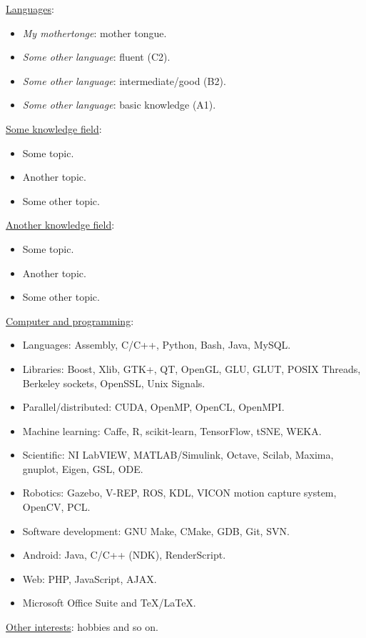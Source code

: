 \addskill%
{%
    \underline{Languages}:%
    \begin{multicols}{2}
        \begin{itemize}[nosep, rightmargin=0cm,after*={\vspace{-\baselineskip}}]%
            \item {\em My mothertonge}: mother tongue.
            \item {\em Some other language}: fluent (C2).
            \columnbreak
            \item {\em Some other language}: intermediate/good (B2).
            \item {\em Some other language}: basic knowledge (A1).%
        \end{itemize}%
    \end{multicols}
}%

\addskill%
{%
    \underline{Some knowledge field}:%
    \begin{itemize}[nosep, rightmargin=0cm]%
        \item Some topic.
        \item Another topic.
        \item Some other topic.
    \end{itemize}%
}%

\addskill%
{%
    \underline{Another knowledge field}:%
    \begin{itemize}[nosep, rightmargin=0cm]%
        \item Some topic.
        \item Another topic.
        \item Some other topic.
    \end{itemize}%
}%

\addskill%
{%
    \underline{Computer and programming}:%
    \begin{itemize}[nosep, rightmargin=0cm]%
        \item Languages: Assembly, C/C++, Python, Bash, Java, MySQL.%
        \item Libraries: Boost, Xlib, GTK+, QT, OpenGL, GLU, GLUT, POSIX Threads,\\Berkeley sockets, OpenSSL, Unix Signals.%
        \item Parallel/distributed: CUDA, OpenMP, OpenCL, OpenMPI.%
        \item Machine learning: Caffe, R, scikit-learn, TensorFlow, tSNE, WEKA.%
        \item Scientific: NI LabVIEW, MATLAB/Simulink, Octave, Scilab, Maxima,\\gnuplot, Eigen, GSL, ODE.
        \item Robotics: Gazebo, V-REP, ROS, KDL, VICON motion capture system,\\OpenCV, PCL.%
        \item Software development: GNU Make, CMake, GDB, Git, SVN.%
        \item Android: Java, C/C++ (NDK), RenderScript.%
        \item Web: PHP, JavaScript, AJAX.%
        \item Microsoft Office Suite and TeX/LaTeX.%
    \end{itemize}%
}%

\addskill%
{%
    \underline{Other interests}: hobbies and so on.
}%
